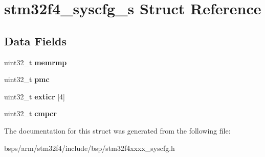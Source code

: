\hypertarget{structstm32f4__syscfg__s}{}\section{stm32f4\+\_\+syscfg\+\_\+s Struct Reference}
\label{structstm32f4__syscfg__s}
\subsection*{Data Fields}
\begin{DoxyCompactItemize}
\item 
\mbox{\label{structstm32f4__syscfg__s_a85c2c9da25cc6761ea1737c61bee8cde}} 
uint32\+\_\+t {\bfseries memrmp}
\item 
\mbox{\label{structstm32f4__syscfg__s_a0e5bdfb651cfc72edc55aff2351d9bfd}} 
uint32\+\_\+t {\bfseries pmc}
\item 
\mbox{\label{structstm32f4__syscfg__s_a31c24be8d75c23665397edc1f74b3173}} 
uint32\+\_\+t {\bfseries exticr} \mbox{[}4\mbox{]}
\item 
\mbox{\label{structstm32f4__syscfg__s_ae594d7d6744191c3508f3b96e2668b8f}} 
uint32\+\_\+t {\bfseries cmpcr}
\end{DoxyCompactItemize}


The documentation for this struct was generated from the following file\+:\begin{DoxyCompactItemize}
\item 
bsps/arm/stm32f4/include/bsp/stm32f4xxxx\+\_\+syscfg.\+h\end{DoxyCompactItemize}
